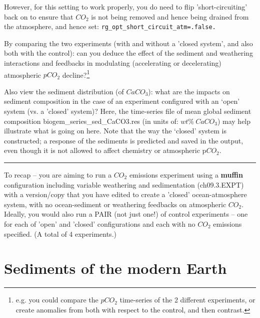However, for this setting to work properly, you do need to flip 'short-circuiting' back on to ensure that \(CO_{2}\) is not being removed and hence being drained from the atmosphere, and hence set: \texttt{rg\_opt\_short\_circuit\_atm=.false.}

\newpage

By comparing the two experiments (with and without a 'closed system', and also both with the control): can you deduce the effect of the sediment and weathering interactions and feedbacks in modulating (accelerating or decelerating) atmospheric \(pCO_{2}\) decline?\footnote{e.g. you could compare the \(pCO_{2}\) time-series of the 2 different experiments, or create anomalies from both with respect to the control, and then contrast.}

Also view the sediment distribution (of \(CaCO_{3}\)): what are the impacts on sediment composition in the case of an experiment configured with an ‘open’ system (vs. a 'closed' system)? Here, the time-series file of mean global sediment composition \textsf{\footnotesize biogem\_series\_sed\_CaCO3.res} (in units of: \(wt\%\:CaCO_{3}\)) may help illustrate what is going on here.
Note that the way the ‘closed’ system is constructed; a response of the sediments is predicted and saved in the output, even though it is not allowed to affect chemistry or atmospheric p\(CO_{2}\).

\vspace{1mm}
\noindent\rule{4cm}{0.1mm}
\vspace{2mm}

\noindent To recap -- you are aiming to run a \(CO_{2}\) emissions experiment using a \textbf{muffin} configuration including variable weathering and sedimentation (\textsf{\footnotesize ch09.3.EXPT}) with a version/copy that you have edited to create a 'closed' ocean-atmosphere system, with no ocean-sediment or weathering feedbacks on atmospheric \(CO_{2}\). Ideally, you would also run a PAIR (not just one!) of control experiments -- one for each of 'open' and 'closed' configurations and each with no \(CO_{2}\) emissions specified. (A total of 4 experiments.)

\newpage

\section{Sediments of the modern Earth}

